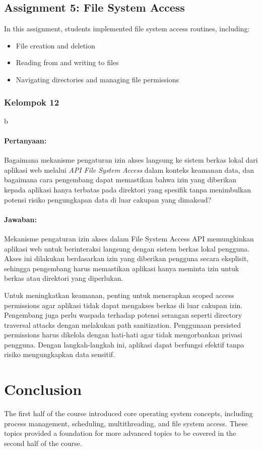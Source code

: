 \documentclass[12pt]{article}
\begin{document}
\subsection{Assignment 5: File System Access}
In this assignment, students implemented file system access routines, including:
\begin{itemize}
    \item File creation and deletion
    \item Reading from and writing to files
    \item Navigating directories and managing file permissions
\end{itemize}

\subsubsection{Kelompok 12}b

\paragraph{Pertanyaan:} Bagaimana mekanisme pengaturan izin akses langsung ke sistem berkas lokal dari aplikasi web melalui \textit{API File System Access }dalam konteks keamanan data, dan bagaimana cara pengembang dapat memastikan bahwa izin yang diberikan kepada aplikasi hanya terbatas pada direktori yang spesifik tanpa menimbulkan potensi risiko pengungkapan data di luar cakupan yang dimaksud?

\paragraph{Jawaban:} Mekanisme pengaturan izin akses dalam File System Access API memungkinkan aplikasi web untuk berinteraksi langsung dengan sistem berkas lokal pengguna. Akses ini dilakukan berdasarkan izin yang diberikan pengguna secara eksplisit, sehingga pengembang harus memastikan aplikasi hanya meminta izin untuk berkas atau direktori yang diperlukan.

Untuk meningkatkan keamanan, penting untuk menerapkan scoped access permissions agar aplikasi tidak dapat mengakses berkas di luar cakupan izin. Pengembang juga perlu waspada terhadap potensi serangan seperti directory traversal attacks dengan melakukan path sanitization. Penggunaan persisted permissions harus dikelola dengan hati-hati agar tidak mengorbankan privasi pengguna. Dengan langkah-langkah ini, aplikasi dapat berfungsi efektif tanpa risiko mengungkapkan data sensitif.



\section{Conclusion}
The first half of the course introduced core operating system concepts, including process management, scheduling, multithreading, and file system access. These topics provided a foundation for more advanced topics to be covered in the second half of the course.
\end{document}
